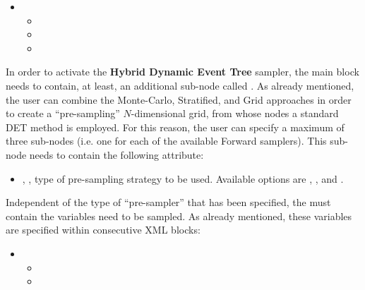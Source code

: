 
\begin{itemize}
  \item \variableDescription
  \variableChildrenIntro
  \begin{itemize}
    \item \distributionDescription
    \item \functionDescription
    \item \gridDescription
  \end{itemize}
\end{itemize}

In order to activate the \textbf{Hybrid Dynamic Event Tree}  sampler, the main
 block needs to contain, at least, an additional
sub-node called .
%
As already mentioned, the user can combine the Monte-Carlo, Stratified, and Grid
approaches in order to create a ``pre-sampling'' $N$-dimensional grid, from
whose nodes a standard DET method is employed.
%
For this reason, the user can specify a maximum of three
 sub-nodes (i.e. one for each of the available
Forward samplers).
%
This sub-node needs to contain the following attribute:
\begin{itemize}
  \item {}, , type of
    pre-sampling strategy to be used.
    Available options are , , and
    .
 \end{itemize}

Independent of the type of ``pre-sampler'' that has been specified, the
 must contain the variables need to be sampled.
%
As already mentioned, these variables are specified within consecutive
 XML blocks:

\begin{itemize}
  \item \variableDescription
    \variableChildrenIntro
    \begin{itemize}
      \item \distributionDescription
      \item \functionDescription
    \end{itemize}
 \end{itemize}

